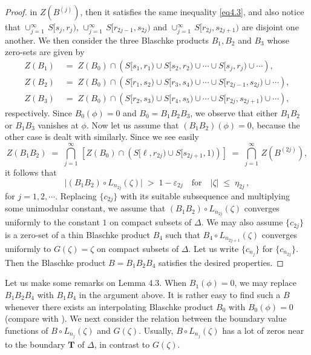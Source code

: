 \documentclass[12pt]{amsart}
\theoremstyle{plain}
\numberwithin{equation}{section}
\begin{document}
\begin{proof}
in $Z(B^{(j)})$, then it satisfies the same inequality \eqref{eq4.3},
and also notice that $\cup_{j=1}^{\infty} \,S[s_j,r_j)$,
$\cup_{j=1}^{\infty} \,S[r_{2j-1},s_{2j})$ and
$\cup_{j=1}^{\infty} \,S[r_{2j},s_{2j+1})$ are disjoint one another.
We then consider the three Blaschke products $B_1, B_2$
and $B_3$ whose zero-sets are given by
\begin{align*}
Z(B_1)\;&=\; Z(B_0)\cap \left(S[s_1,r_1)\cup S[s_2,r_2)
\cup \cdots\cup S[s_j,r_j)\cup \cdots \right), \\
Z(B_2)\;&=\; Z(B_0)\cap \left(S[r_1,s_2)\cup S[r_3,s_4)
\cup \cdots\cup S[r_{2j-1},s_{2j})\cup\cdots \right), \\
Z(B_3)\;&=\; Z(B_0)\cap \left(S[r_2,s_3)\cup S[r_4,s_5)
\cup \cdots\cup S[r_{2j},s_{2j+1})\cup\cdots \right),
\end{align*}
respectively. Since $ B_0(\phi) = 0$ and $B_0=B_1B_2B_3$,
we observe that
either $B_1 B_2$ or $B_1 B_3$ vanishes at $\phi$. Now let
us assume that $(B_1B_2)(\phi) = 0$, because the other case
is dealt with similarly. Since we see easily
$$
Z(B_1B_2)\;=\;\bigcap_{j=1}^{\infty}\,\left[Z(B_0)\cap \left(S[\ell,r_{2j})\cup S[s_{2j+1},1)\right)\right]
\;=\; \bigcap_{j=1}^{\infty}\,Z(B^{(2j)}),
$$
it follows that
$$
\vert (B_1B_2)\circ L_{n_{2j}}(\zeta)\vert\; >\; 1-\varepsilon_{2j}
 \quad \text{for}\quad \vert \zeta \vert \;\le \;\eta_{2j}\,,
$$
for $j=1, 2, \cdots.$
Replacing $\{c_{2j}\}$ with its suitable subsequence and
multiplying some unimodular constant, we assume that
$(B_1B_2)\circ L_{n_{2j}}(\zeta)$ converges
uniformly to the constant $1$ on compact subsets of $\Delta$.
We may also assume $\{c_{2j}\}$
is a zero-set of a thin Blaschke product $B_4$ such that
$B_4\circ L_{n_{2j+1}}(\zeta)$ converges uniformly to
$G(\zeta)=\zeta$ on compact subsets of $\Delta$.
Let us write $\{c_{n_j}\}$ for $\{c_{n_{2j}}\}$.
Then the Blaschke product $B=B_1B_2B_4$ satisfies the desired
properties.
\end{proof}

\medskip
Let us make some remarks on Lemma 4.3. When $B_1(\phi)=0$,
we may replace $B_1B_2B_4$ with $B_1B_4$ in the argument above.
It is rather easy to find such a $B$ whenever there exists an
interpolating Blaschke product $B_0$ with $B_0(\phi)=0$
(compare with \cite[Chapter IX, Lemma 3.3]{Ga}).
We next consider the relation between the boundary value
functions of $B\circ L _{n_j}(\zeta)$ and $G(\zeta)$.
Usually, $B\circ L _{n_j}(\zeta)$ has a lot of zeros near to
the boundary $\mathbf{T}$ of $\Delta$, in contrast to $G(\zeta)$.
\end{document}
